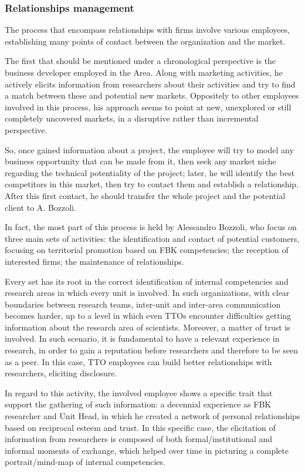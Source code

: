 \subsubsection{Relationships management}

The process that encompass relationships with firms involve various employees, establishing many points of contact between the organization and the market.

The first that should be mentioned under a chronological perspective is the business developer employed in the Area. Along with marketing activities, he actively elicits information from researchers about their activities and try to find a match between these and potential new markets. Oppositely to other employees involved in this process, his approach seems to point at new, unexplored or still completely uncovered markets, in a disruptive rather than incremental perspective. 

So, once gained information about a project, the employee will try to model any business opportunity that can be made from it, then seek any market niche regarding the technical potentiality of the project; later, he will identify the best competitors in this market, then try to contact them and establish a relationship. After this first contact, he should transfer the whole project and the potential client to A. Bozzoli.

In fact, the most part of this process is held by Alessandro Bozzoli, who focus on three main sets of activities: the identification and contact of potential customers, focusing on territorial promotion based on FBK competencies; the reception of interested firms; the maintenance of relationships. 

Every set has its root in the correct identification of internal competencies and research areas in which every unit is involved. In such organizations, with clear boundaries between research teams, inter-unit and inter-area communication becomes harder, up to a level in which even TTOs encounter difficulties getting information about the research area of scientists. Moreover, a matter of trust is involved. In such scenario, it is fundamental to have a relevant experience in research, in order to gain a reputation before researchers and therefore to be seen as a peer. In this case, TTO employees can build better relationships with researchers, eliciting disclosure.

In regard to this activity, the involved employee shows a specific trait that support the gathering of such information: a decennial experience as FBK researcher and Unit Head, in which he created a network of personal relationships based on reciprocal esteem and trust. In this specific case, the elicitation of information from researchers is composed of both formal/institutional and informal moments of exchange, which helped over time in picturing a complete portrait/mind-map of internal competencies.

